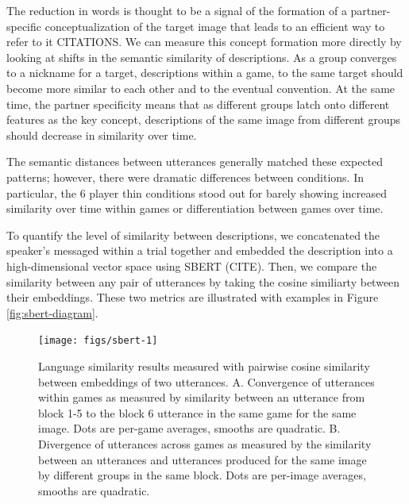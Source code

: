 \documentclass[
  english,
  a4paper,
]{article}
\begin{document}
The reduction in words is thought to be a signal of the formation of a partner-specific conceptualization of the target image that leads to an efficient way to refer to it CITATIONS. We can measure this concept formation more directly by looking at shifts in the semantic similarity of descriptions. As a group converges to a nickname for a target, descriptions within a game, to the same target should become more similar to each other and to the eventual convention. At the same time, the partner specificity means that as different groups latch onto different features as the key concept, descriptions of the same image from different groups should decrease in similarity over time.

The semantic distances between utterances generally matched these expected patterns; however, there were dramatic differences between conditions. In particular, the 6 player thin conditions stood out for barely showing increased similarity over time within games or differentiation between games over time.

To quantify the level of similarity between descriptions, we concatenated the speaker's messaged within a trial together and embedded the description into a high-dimensional vector space using SBERT (CITE). Then, we compare the similarity between any pair of utterances by taking the cosine similiarty between their embeddings. These two metrics are illustrated with examples in Figure \ref{fig:sbert-diagram}.

\begin{figure}[t!]

{\centering \texttt{[image: figs/sbert-1]} 

}

\caption{Language similarity results measured with pairwise cosine similarity between embeddings of two utterances. A. Convergence of utterances within games as measured by similarity between an utterance from block 1-5 to the block 6 utterance in the same game for the same image. Dots are per-game averages, smooths are quadratic. B. Divergence of utterances across games as measured by the similarity between an utterances and utterances produced for the same image by different groups in the same block. Dots are per-image averages, smooths are quadratic.}\label{fig:sbert}
\end{figure}
\end{document}
